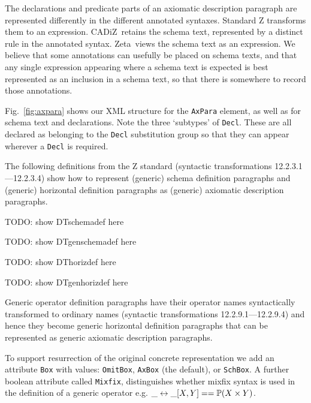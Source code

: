\documentclass{llncs}  %
\newcommand{\AFont}[1]{\texttt{#1}}
\newcommand{\CADiZ}{CADiZ}
\newcommand{\Zeta}{Zeta}
\newcommand{\DTschemadef}{\par TODO: show DTschemadef here \par}
\newcommand{\DTgenschemadef}{\par TODO: show DTgenschemadef here \par}
\newcommand{\DThorizdef}{\par TODO: show DThorizdef here \par}
\newcommand{\DTgenhorizdef}{\par TODO: show DTgenhorizdef here \par}
\begin{document}
The declarations and predicate parts of an axiomatic description paragraph
are represented differently in the different annotated syntaxes.
Standard Z transforms them to an expression.
\CADiZ\ retains the schema text,
represented by a distinct rule in the annotated syntax.
\Zeta\ views the schema text as an expression.
We believe that some annotations can usefully be placed on schema texts,
and that any single expression appearing where a schema text is expected
is best represented as an inclusion in a schema text,
so that there is somewhere to record those annotations.

Fig.~\ref{fig:axpara} shows our XML structure for the \AFont{AxPara}
element, as well as for schema text and declarations.  Note the
three `subtypes' of \AFont{Decl}.  These are all declared as belonging to
the \AFont{Decl} substitution group so that they can appear wherever
a \AFont{Decl} is required.

The following definitions from the Z standard
(syntactic transformations 12.2.3.1---12.2.3.4)
show how to represent (generic) schema definition paragraphs
and (generic) horizontal definition paragraphs
as (generic) axiomatic description paragraphs.
\DTschemadef
\DTgenschemadef
\DThorizdef
\DTgenhorizdef
Generic operator definition paragraphs have their operator names
syntactically transformed to ordinary names
(syntactic transformations 12.2.9.1---12.2.9.4)
and hence they become generic horizontal definition paragraphs
that can be represented as generic axiomatic description paragraphs.

To support resurrection of the original concrete representation we add an
attribute \AFont{Box} with values: \AFont{OmitBox}, \AFont{AxBox} (the
default), or \AFont{SchBox}.  A further boolean attribute called
\AFont{Mixfix}, distinguishes whether mixfix syntax is used in the 
definition of a generic operator
e.g. $\_ \rel \_ [X,Y] == \power(X \cross Y)$.
\end{document}
